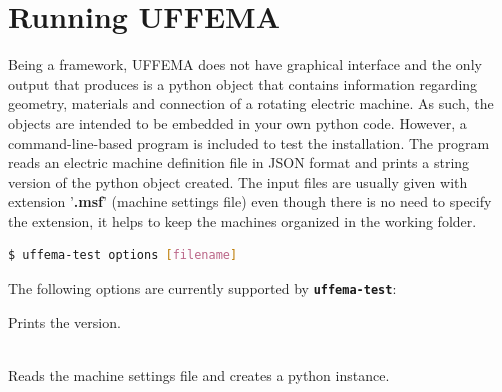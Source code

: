 \documentclass[justified]{tufte-book} %
\begin{document}
\section{Running UFFEMA}
\begin{fullwidth}
Being a framework, UFFEMA does not have graphical interface and the only output that produces is a python object that contains information regarding geometry, materials and connection of a rotating electric machine. As such, the objects are intended to be embedded in your own python code. However, a command-line-based  program is included to test the installation. The program reads an electric machine definition file in JSON format and prints a string version of the python object created. The input files are usually given with extension '\textbf{.msf}' (machine settings file) even though there is no need to specify the extension, it helps to keep the machines organized in the working folder. 
\end{fullwidth}
\begin{lstlisting}[language=bash]
$ uffema-test options [filename]
\end{lstlisting}

The following options are currently supported by \textbf{\texttt{uffema-test}}:
 \begin{description}[leftmargin=1cm, style=nextline]
\item [{\normalfont\ttfamily{\textbf{-v}}}]  \hfil \newline Prints the version.
 \item [{\normalfont\ttfamily{\textbf{-f}}}]  {} \\ Reads the machine settings file and creates a python instance. 					
 \end{description}

\end{document}
